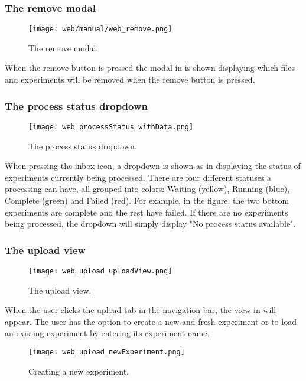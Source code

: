 \subsubsection{The remove modal}
\begin{figure}[h]
\centering
\texttt{[image: web/manual/web\_remove.png]}
\caption{\label{fig:web_remove_removeFiles}The remove modal.}
\end{figure}
\FloatBarrier
When the remove button is pressed the modal in  is shown displaying which files and experiments will be removed when the remove button is pressed.

\subsubsection{The process status dropdown}
\begin{figure}[h]
\centering
\texttt{[image: web\_processStatus\_withData.png]}
\caption{\label{fig:web_processStatus_withData}The process status dropdown.}
\end{figure}
\FloatBarrier
When pressing the inbox icon, a dropdown is shown as in  displaying the status of experiments currently being processed. There are four different statuses a processing can have, all grouped into colors: Waiting (yellow), Running (blue), Complete (green) and Failed (red). For example, in the figure, the two bottom experiments are complete and the rest have failed. If there are no experiments being processed, the dropdown will simply display "No process status available".

\subsubsection{The upload view}

\begin{figure}[h]
\centering
\texttt{[image: web\_upload\_uploadView.png]}
\caption{\label{fig:web_upload_uploadView}The upload view.}
\end{figure}

When the user clicks the upload tab in the navigation bar, the view in  will appear. The user has the option to create a new and fresh experiment or to load an existing experiment by entering its experiment name. 

\begin{figure}[h]
\centering
\texttt{[image: web\_upload\_newExperiment.png]}
\caption{\label{fig:web_upload_newExperiment}Creating a new experiment.}
\end{figure}

